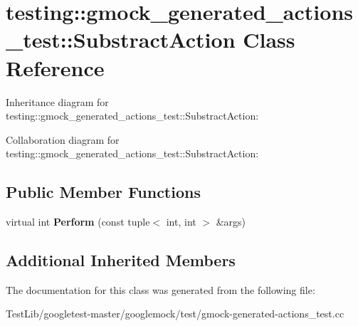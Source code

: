 \hypertarget{classtesting_1_1gmock__generated__actions__test_1_1SubstractAction}{}\section{testing\+:\+:gmock\+\_\+generated\+\_\+actions\+\_\+test\+:\+:Substract\+Action Class Reference}
\label{classtesting_1_1gmock__generated__actions__test_1_1SubstractAction}


Inheritance diagram for testing\+:\+:gmock\+\_\+generated\+\_\+actions\+\_\+test\+:\+:Substract\+Action\+:


Collaboration diagram for testing\+:\+:gmock\+\_\+generated\+\_\+actions\+\_\+test\+:\+:Substract\+Action\+:
\subsection*{Public Member Functions}
\begin{DoxyCompactItemize}
\item 
\mbox{\label{classtesting_1_1gmock__generated__actions__test_1_1SubstractAction_ac049ec6196668e17ef7384e08914f2c3}} 
virtual int {\bfseries Perform} (const tuple$<$ int, int $>$ \&args)
\end{DoxyCompactItemize}
\subsection*{Additional Inherited Members}


The documentation for this class was generated from the following file\+:\begin{DoxyCompactItemize}
\item 
Test\+Lib/googletest-\/master/googlemock/test/gmock-\/generated-\/actions\+\_\+test.\+cc\end{DoxyCompactItemize}
